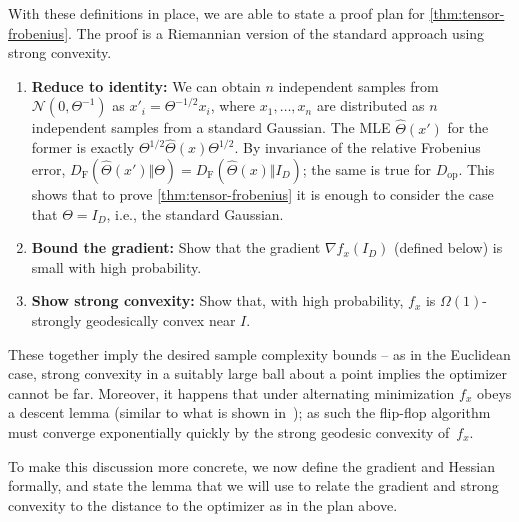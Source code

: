 \documentclass[aos]{imsart}
\theoremstyle{definition}
\numberwithin{equation}{section}
\newcommand{\cN}{\mathcal{N}}
\newcommand{\samp}{x}
\newcommand{\DF}{D_{\operatorname{F}}}
\newcommand{\Dop}{D_{\operatorname{op}}}
\begin{document}



With these definitions in place, we are able to state a proof plan for \cref{thm:tensor-frobenius}. The proof is a Riemannian version of the standard approach using strong convexity.

\begin{enumerate}
\item\label{it:reduce}
\textbf{Reduce to identity:}
We can obtain $n$ independent samples from $\cN(0, \Theta^{-1})$ as $x'_i = \Theta^{-1/2} x_i$, where $x_1,\dots,x_n$ are distributed as $n$ independent samples from a standard Gaussian.
The MLE $\widehat{\Theta}(x')$ for the former is exactly $\Theta^{1/2} \widehat{\Theta}(x) \Theta^{1/2}$.
By invariance of the relative Frobenius error, $\DF(\widehat\Theta(x') \Vert \Theta) = \DF(\widehat\Theta(x) \Vert I_D)$; the same is true for $\Dop$.
This shows that to prove \cref{thm:tensor-frobenius} it is enough to consider the case that $\Theta = I_D$, i.e., the standard Gaussian.
\item\label{it:grad} \textbf{Bound the gradient:}
Show that the gradient $\nabla f_x(I_D)$ (defined below) is small with high probability.
\item\label{it:convexity} \textbf{Show strong convexity:}
Show that, with high probability, $f_x$ is $\Omega(1)$-strongly geodesically convex near $I$.
\end{enumerate}

These together imply the desired sample complexity bounds -- as in the Euclidean case, strong convexity in a suitably large ball about a point implies the optimizer cannot be far. Moreover, it happens that under alternating minimization $f_\samp$ obeys a descent lemma (similar to what is shown in~\cite{burgisser2017alternating}); as such the flip-flop algorithm must converge exponentially quickly by the strong geodesic convexity of~$f_\samp$.

To make this discussion more concrete, we now define the gradient and Hessian formally, and state the lemma that we will use to relate the gradient and strong convexity to the distance to the optimizer as in the plan above.
\end{document}
